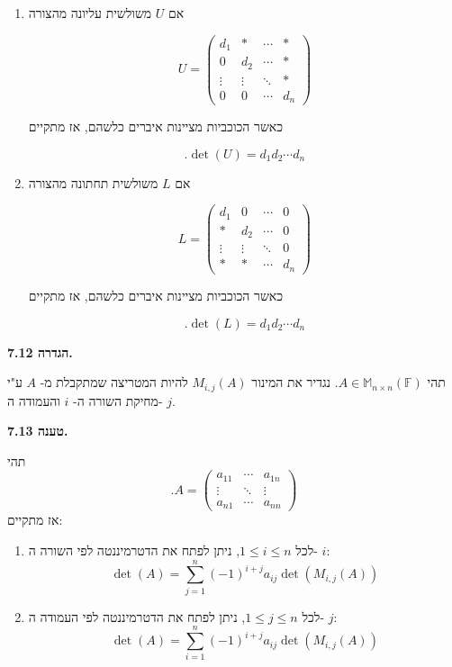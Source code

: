 \documentclass[12pt]{report}
\theoremstyle{plain}
\theoremstyle{definition}
\newcommand{\F}{\mathbb{F}}
\newcommand{\M}{\mathbb{M}}
\newcommand{\0}{\mathbf{0}}
\begin{document}
\begin{enumerate}[label=\alph*.]
\item
אם
$U$
משולשית עליונה מהצורה

$$
U=\begin{pmatrix}
d_1 &* & \cdots & * \\
0 & d_2 & \cdots & * \\
\vdots & \vdots & \ddots & * \\
0 & 0 & \cdots & d_n
\end{pmatrix}
$$

כאשר הכוכביות מציינות איברים כלשהם,
אז מתקיים

$$
.\det(U)=d_1d_2\cdots d_n
$$

\item 
אם
$L$
משולשית תחתונה מהצורה

$$
L=\begin{pmatrix}
d_1 &0 & \cdots & 0 \\
* & d_2 & \cdots & 0 \\
\vdots & \vdots & \ddots & 0 \\
* & * & \cdots & d_n
\end{pmatrix}
$$

כאשר הכוכביות מציינות איברים כלשהם,
אז מתקיים

$$
.\det(L)=d_1d_2\cdots d_n
$$


\end{enumerate}
\bigskip
\bigskip

\noindent\textbf{הגדרה 7.12.}

תהי
$A\in\M_{n\times n}(\F)$.
נגדיר את המינור
$M_{i,j}(A)$
להיות המטריצה שמתקבלת מ-
$A$
ע"י מחיקת השורה ה-
$i$
והעמודה ה-
$j$.
\bigskip
\bigskip

\noindent\textbf{טענה 7.13.}

תהי
$$
.A=\begin{pmatrix}a_{11} & \cdots & a_{1n}\\
\vdots & \ddots & \vdots\\
a_{n1} & \cdots & a_{nn}
\end{pmatrix}
$$
אז מתקיים:
\begin{enumerate}[label=\alph*.]
\item
לכל
$1\leq i \leq n$, 
ניתן לפתח את הדטרמיננטה לפי השורה ה-
$i$:
$$
\det(A)=\sum_{j=1}^n (-1)^{i+j}a_{ij}\det(M_{i,j}(A))
$$


\item
לכל
$1\leq j \leq n$, 
ניתן לפתח את הדטרמיננטה לפי העמודה ה-
$j$:
$$
\det(A)=\sum_{i=1}^n (-1)^{i+j}a_{ij}\det(M_{i,j}(A))
$$


\end{enumerate}
\bigskip
\bigskip
\end{document}
